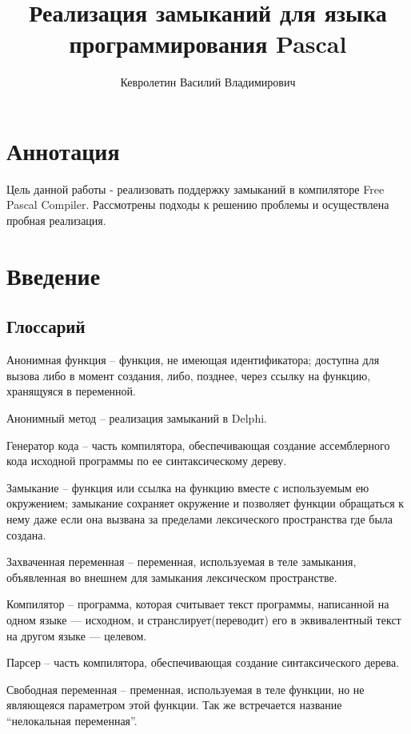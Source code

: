 \documentclass{imcs}
\title{Реализация замыканий для языка программирования Pascal}
\author{Кевролетин Василий Владимирович}
\begin{document}
\maketitle

\tableofcontents
\pagebreak

\section*{Аннотация}
Цель данной работы - реализовать поддержку замыканий в компиляторе Free Pascal Compiler.
Рассмотрены подходы к решению проблемы и осуществлена пробная реализация.

\pagebreak

\section{Введение}
\subsection{Глоссарий}

Анонимная функция -- функция, не имеющая идентификатора; доступна для
вызова либо в момент создания, либо, позднее, через ссылку на функцию,
хранящуяся в переменной.

Анонимный метод -- реализация замыканий в Delphi. 

Генератор кода -- часть компилятора, обеспечивающая создание
ассемблерного кода исходной программы по ее синтаксическому дереву.

Замыкание -- функция или ссылка на функцию вместе с используемым ею
окружением; замыкание сохраняет окружение и позволяет функции
обращаться к нему даже если она вызвана за пределами лексического
пространства где была создана.

Захваченная переменная -- переменная, используемая в теле замыкания,
объявленная во внешнем для замыкания лексическом пространстве.

Компилятор -- программа, которая считывает текст программы, написанной
на одном языке — исходном, и странслирует(переводит) его в
эквивалентный текст на другом языке — целевом.

Парсер -- часть компилятора, обеспечивающая создание синтаксического
дерева.

Свободная переменная -- пременная, используемая в теле функции, но не
являющеяся параметром этой функции. Так же встречается название
``нелокальная переменная''.
\end{document}

